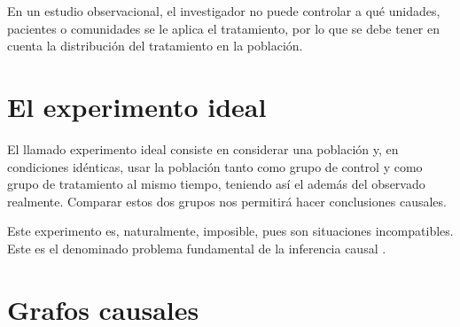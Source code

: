     En un estudio observacional, el investigador no puede controlar a qué unidades, pacientes o comunidades se le aplica el tratamiento,
    por lo que se debe tener en cuenta la distribución del tratamiento en la población.
\fi


\section{El experimento ideal}
El llamado experimento ideal \cite[sección 1.1]{targetedLearning} consiste en considerar una población y, en condiciones idénticas,
usar la población tanto como grupo de control y como grupo de tratamiento al mismo tiempo,
teniendo así el  además del observado realmente.
Comparar estos dos grupos nos permitirá hacer conclusiones causales.

Este experimento es, naturalmente, imposible, pues son situaciones incompatibles. Este es el denominado
problema fundamental de la inferencia causal \cite[sección 2.1]{mci}.


\section{Grafos causales}

